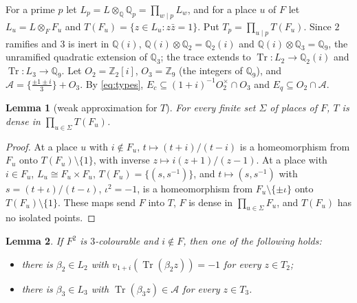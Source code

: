 \documentclass[11pt,a4paper]{amsart}
\newtheorem{lemma}{Lemma}
\theoremstyle{remark}
\newcommand{\Q}{\mathbb{Q}}
\newcommand{\Z}{\mathbb{Z}}
\newcommand{\Tr}{\operatorname{Tr}}
\newcommand{\cA}{\mathcal{A}}
\begin{document}
For a prime $p$ let $L_p=L\otimes_\Q\Q_p=\prod_{w\mid p}L_w$, and for a place $u$ of $F$ let
$L_u=L\otimes_FF_u$ and $T(F_u)=\{z\in L_u:z\bar z=1\}$. Put $T_p=\prod_{u\mid p}T(F_u)$. Since $2$ ramifies and $3$
is inert in $\Q(i)$, $\Q(i)\otimes\Q_2=\Q_2(i)$ and $\Q(i)\otimes\Q_3=\Q_9$, the unramified quadratic extension of
$\Q_3$; the trace extends to $\Tr:L_2\to\Q_2(i)$ and $\Tr:L_3\to\Q_9$. Let $O_2=\Z_2[i]$, $O_3=\Z_9$ (the integers of
$\Q_9$), and $\cA=\{\frac{\pm1\pm i}3\}+O_3$. By \eqref{eq:types}, $E_c\subseteq(1+i)^{-1}O_2^\times\cap O_3$ and
$E_q\subseteq O_2\cap\cA$.

\begin{lemma}[weak approximation for $T$]\label{lem:WA}
For every finite set $\Sigma$ of places of $F$, $T$ is dense in $\prod_{u\in\Sigma}T(F_u)$.
\end{lemma}

\begin{proof}
At a place $u$ with $i\notin F_u$, $t\mapsto(t+i)/(t-i)$ is a homeomorphism from $F_u$ onto $T(F_u)\setminus\{1\}$,
with inverse $z\mapsto i(z+1)/(z-1)$. At a place with $i\in F_u$, $L_u\cong F_u\times F_u$,
$T(F_u)=\{(s,s^{-1})\}$, and $t\mapsto(s,s^{-1})$ with $s=(t+\iota)/(t-\iota)$, $\iota^2=-1$, is a homeomorphism
from $F_u\setminus\{\pm\iota\}$ onto $T(F_u)\setminus\{1\}$. These maps send $F$ into $T$, $F$ is dense in
$\prod_{u\in\Sigma}F_u$, and $T(F_u)$ has no isolated points.
\end{proof}

\begin{lemma}\label{lem:B2}
If $F^2$ is $3$-colourable and $i\notin F$, then one of the following holds:
\begin{itemize}
\item[(c)] there is $\beta_2\in L_2$ with $v_{1+i}(\Tr(\beta_2z))=-1$ for every $z\in T_2$;
\item[(q)] there is $\beta_3\in L_3$ with $\Tr(\beta_3z)\in\cA$ for every $z\in T_3$.
\end{itemize}
\end{lemma}
\end{document}
